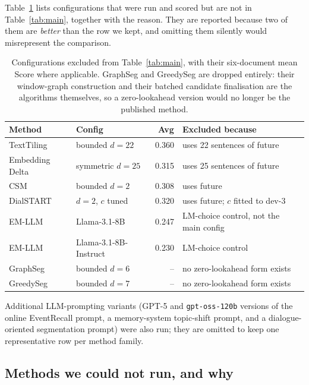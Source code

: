 Table~\ref{tab:app-excluded} lists configurations that were run and scored but
are not in Table~\ref{tab:main}, together with the reason. They are reported
because two of them are \emph{better} than the row we kept, and omitting them
silently would misrepresent the comparison.

\begin{table}[t]
\centering\small
\begin{tabular}{@{}llrl@{}}
\toprule
Method & Config & Avg & Excluded because \\
\midrule
TextTiling      & bounded $d{=}22$      & 0.360 & uses 22 sentences of future \\
Embedding Delta & symmetric $d{=}25$    & 0.315 & uses 25 sentences of future \\
CSM             & bounded $d{=}2$       & 0.308 & uses future \\
DialSTART       & $d{=}2$, $c$ tuned    & 0.320 & uses future; $c$ fitted to dev-3 \\
EM-LLM          & Llama-3.1-8B          & 0.247 & LM-choice control, not the main config \\
EM-LLM          & Llama-3.1-8B-Instruct & 0.230 & LM-choice control \\
GraphSeg        & bounded $d{=}6$       & --    & no zero-lookahead form exists \\
GreedySeg       & bounded $d{=}7$       & --    & no zero-lookahead form exists \\
\bottomrule
\end{tabular}
\caption{Configurations excluded from Table~\ref{tab:main}, with their six-document
mean Score where applicable. GraphSeg and GreedySeg are dropped entirely: their
window-graph construction and their batched candidate finalisation are the
algorithms themselves, so a zero-lookahead version would no longer be the
published method.}
\label{tab:app-excluded}
\end{table}

Additional LLM-prompting variants (GPT-5 and \texttt{gpt-oss-120b} versions of
the online EventRecall prompt, a memory-system topic-shift prompt, and a
dialogue-oriented segmentation prompt) were also run; they are omitted to keep
one representative row per method family.

\subsection{Methods we could not run, and why}
\label{app:baselines-unreproducible}

